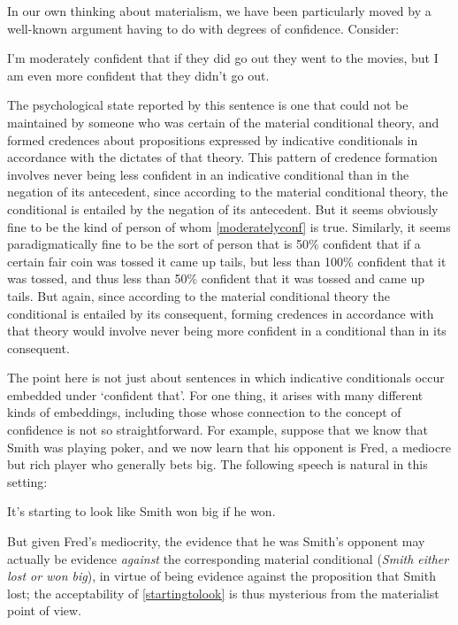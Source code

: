 \documentclass[If.tex]{subfiles}
\begin{document}
In our own thinking about materialism, we have been particularly moved by a well-known argument having to do with degrees of confidence.  Consider:
\begin{prop}
	\nitem \label{moderatelyconf}
	I'm moderately confident that if they did go out they went to the movies, but I am even more confident that they didn't go out.  
\end{prop}
The psychological state reported by this sentence is one that could not be maintained by someone who was certain of the material conditional theory, and formed credences about propositions expressed by indicative conditionals in accordance with the dictates of that theory.  This pattern of credence formation involves never being less confident in an indicative conditional than in the negation of its antecedent, since according to the material conditional theory, the conditional is entailed by the negation of its antecedent.  But it seems obviously fine to be the kind of person of whom \ref{moderatelyconf} is true.  Similarly, it seems paradigmatically fine to be the sort of person that is 50\% confident that if a certain fair coin was tossed it came up tails, but less than 100\% confident that it was tossed, and thus less than 50\% confident that it was tossed and came up tails.  But again, since according to the material conditional theory the conditional is entailed by its consequent, forming credences in accordance with that theory would involve never being more confident in a conditional than in its consequent.  

The point here is not just about sentences in which indicative conditionals occur embedded under ‘confident that’.  For one thing, it arises with many different kinds of embeddings, including those whose connection to the concept of confidence is not so straightforward.  For example, suppose that we know that Smith was playing poker, and we now learn that his opponent is Fred, a mediocre but rich player who generally bets big.  The following speech is natural in this setting:
\begin{prop}
	\nitem \label{startingtolook}
	It's starting to look like Smith won big if he won.  
\end{prop}
But given Fred's mediocrity, the evidence that he was Smith's opponent may actually be evidence \emph{against} the corresponding material conditional (\emph{Smith either lost or won big}), in virtue of being evidence against the proposition that Smith lost; the acceptability of \ref{startingtolook} is thus mysterious from the materialist point of view.  
\end{document}
